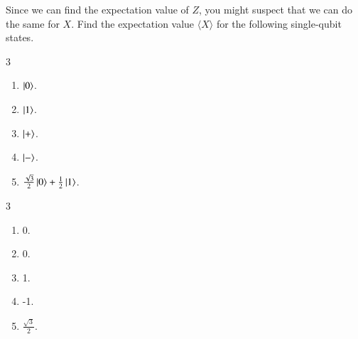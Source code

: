 \begin{exercise}
Since we can find the expectation value of $Z$, you might suspect that we can do the same for $X$. Find the expectation value $\langle X\rangle$ for the following single-qubit states.
\begin{multicols}{3}
\begin{enumerate}[label=(\alph*)]
    \item $\left| 0 \right\rangle$.
    \item $\left| 1 \right\rangle$.
    \item $\left| + \right\rangle$.
    \item $\left| - \right\rangle$.
    \item $\frac{\sqrt{3}}{2}\left| 0 \right\rangle + \frac{1}{2}\left| 1 \right\rangle$.
\end{enumerate}
\end{multicols}
\end{exercise}
\begin{solution}
\begin{multicols}{3}
\begin{enumerate}[label=(\alph*)]
    \item 0.
    \item 0.
    \item 1.
    \item -1.
    \item $\frac{\sqrt{3}}{2}$.
\end{enumerate}
\end{multicols}
\end{solution}

